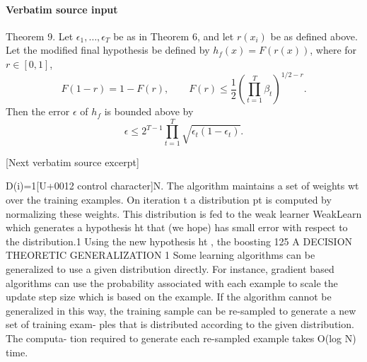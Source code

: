 \documentclass[10pt]{article}
\begin{document}
\paragraph{Verbatim source input}
\begin{ReviewVerbatim}
Theorem 9. Let $\epsilon_1,\ldots,\epsilon_T$ be as in Theorem 6, and let
$r(x_i)$ be as defined above. Let the modified final hypothesis be defined by
$h_f(x)=F(r(x))$, where for $r\in[0,1]$,
$$
F(1-r)=1-F(r),\qquad
F(r)\leq\frac12\left(\prod_{t=1}^T\beta_t\right)^{1/2-r}.
$$
Then the error $\epsilon$ of $h_f$ is bounded above by
$$
\epsilon\leq 2^{T-1}\prod_{t=1}^T\sqrt{\epsilon_t(1-\epsilon_t)}.
$$

[Next verbatim source excerpt]

D(i)=1[U+0012 control character]N. The algorithm maintains a set of weights wt
over
the training examples. On iteration t a distribution pt
is
computed by normalizing these weights. This distribution is
fed to the weak learner WeakLearn which generates a
hypothesis ht that (we hope) has small error with respect to
the distribution.1
Using the new hypothesis ht , the boosting
125
A DECISION THEORETIC GENERALIZATION
1
Some learning algorithms can be generalized to use a given distribution
directly. For instance, gradient based algorithms can use the probability
associated with each example to scale the update step size which is based
on the example. If the algorithm cannot be generalized in this way, the
training sample can be re-sampled to generate a new set of training exam-
ples that is distributed according to the given distribution. The computa-
tion required to generate each re-sampled example takes O(log N) time.


\end{ReviewVerbatim}
\end{document}
